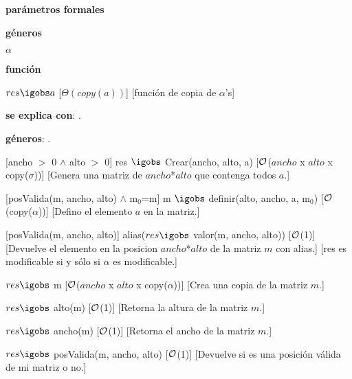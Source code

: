 \begin{Interfaz}

	\textbf{parámetros formales}\parindent\\
	\parbox{1.7cm}{\textbf{géneros}} $\alpha$\\	\parbox[t]{1.7cm}{\textbf{función}}\parbox[t]{\textwidth-2\parindent-1.7cm}{%
	{$res \igobs a$}
	[$\Theta(copy(a))$]
	[función de copia de $\alpha$'s]
	}

	\textbf{se explica con}: .

	\textbf{géneros}: .


	[ancho $>$ 0 $\land$ alto $>$ 0]
	{res $\igobs$ Crear(ancho, alto, a)}
	[$\mathcal{O}$($ancho$ x $alto$ x copy($\sigma$))]
	[Genera una matriz de $ancho$*$alto$ que contenga todos $a$.]

	[posValida(m, ancho, alto) $\land$ m$_0$=m]
	{m $\igobs$ definir(alto, ancho, a, m$_0$)}
	[$\mathcal{O}$(copy($\alpha$))]
	[Defino el elemento $a$ en la matriz.]
	
	[posValida(m, ancho, alto)]
	{alias($res \igobs$ valor(m, ancho, alto))}
	[$\mathcal{O}$(1)]
	[Devuelve el elemento en la posicion $ancho$*$alto$ de la matriz $m$ con alias.]
	[res es modificable si y sólo si $\alpha$ es modificable.]

	{$res \igobs$ m}  
	[$\mathcal{O}$($ancho$ x $alto$ x copy($\alpha$))]
	[Crea una copia de la matriz $m$.]

	{$res \igobs$ alto(m)}  
	[$\mathcal{O}$(1)]
	[Retorna la altura de la matriz $m$.]

	{$res \igobs$ ancho(m)}  
	[$\mathcal{O}$(1)]
	[Retorna el ancho de la matriz $m$.]

	{$res \igobs$ posValida(m, ancho, alto)}  
	[$\mathcal{O}$(1)]
	[Devuelve si es una posición válida de mi matriz o no.]
	
\end{Interfaz}

